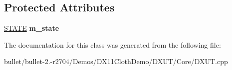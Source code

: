 \subsection*{Protected Attributes}
\begin{DoxyCompactItemize}
\item 
\hypertarget{class_d_x_u_t_state_ac77bc02614deabbbbfde3190f2f0b9fe}{\hyperlink{struct_d_x_u_t_state_1_1_s_t_a_t_e}{S\+T\+A\+T\+E} {\bfseries m\+\_\+state}}\label{class_d_x_u_t_state_ac77bc02614deabbbbfde3190f2f0b9fe}

\end{DoxyCompactItemize}


The documentation for this class was generated from the following file\+:\begin{DoxyCompactItemize}
\item 
bullet/bullet-\/2.-\/r2704/\+Demos/\+D\+X11\+Cloth\+Demo/\+D\+X\+U\+T/\+Core/D\+X\+U\+T.\+cpp\end{DoxyCompactItemize}
